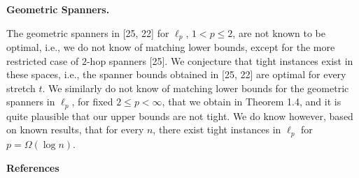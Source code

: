 \par
\par
\par
\par\medskip\noindent\textbf{Geometric Spanners.}\par
The geometric spanners in [25, 22] for $\ell_{p}$, $1<p\leq 2$, are not known to be optimal, i.e., we do not know of matching lower bounds, except for the more restricted case of $2$-hop spanners [25]. We conjecture that tight instances exist in these spaces, i.e., the spanner bounds obtained in [25, 22] are optimal for every stretch $t$. We similarly do not know of matching lower bounds for the geometric spanners in $\ell_{p}$, for fixed $2\leq p<\infty$, that we obtain in Theorem 1.4, and it is quite plausible that our upper bounds are not tight. We do know however, based on known results, that for every $n$, there exist tight instances in $\ell_{p}$ for $p=\Omega(\log{n})$.
\par
\par
\par
\par\medskip\noindent\textbf{References}\par
